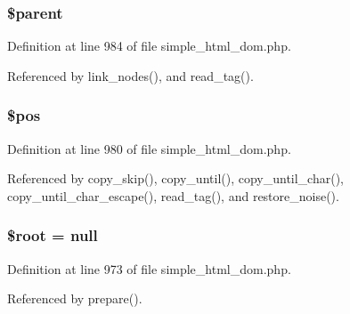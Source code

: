 \subsubsection[{\$parent}]{\setlength{\rightskip}{0pt plus 5cm}\$parent\hspace{0.3cm}{\ttfamily [protected]}}\label{classsimple__html__dom_a4e2313a4b35b72a06ac45fd38960f677}


Definition at line 984 of file simple\+\_\+html\+\_\+dom.\+php.



Referenced by link\+\_\+nodes(), and read\+\_\+tag().

\hypertarget{classsimple__html__dom_a5de51f0c80b3bb3b39a57b23f6b9ea9f}{}
\subsubsection[{\$pos}]{\setlength{\rightskip}{0pt plus 5cm}\$pos\hspace{0.3cm}{\ttfamily [protected]}}\label{classsimple__html__dom_a5de51f0c80b3bb3b39a57b23f6b9ea9f}


Definition at line 980 of file simple\+\_\+html\+\_\+dom.\+php.



Referenced by copy\+\_\+skip(), copy\+\_\+until(), copy\+\_\+until\+\_\+char(), copy\+\_\+until\+\_\+char\+\_\+escape(), read\+\_\+tag(), and restore\+\_\+noise().

\hypertarget{classsimple__html__dom_ab37f7c32f41c3c61ed940887453767f4}{}
\subsubsection[{\$root}]{\setlength{\rightskip}{0pt plus 5cm}\$root = null}\label{classsimple__html__dom_ab37f7c32f41c3c61ed940887453767f4}


Definition at line 973 of file simple\+\_\+html\+\_\+dom.\+php.



Referenced by prepare().

\hypertarget{classsimple__html__dom_af36f0e679f54f7ee558dd5b96d4b8727}{}
